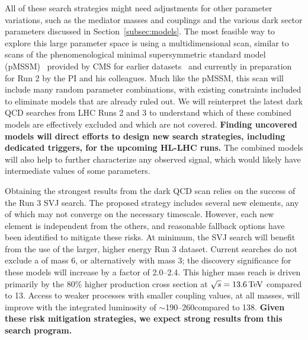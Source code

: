All of these search strategies might need adjustments for other parameter variations,
such as the mediator masses and couplings and the various dark sector parameters discussed in Section~\ref{subsec:models}.
The most feasible way to explore this large parameter space is using a multidimensional scan,
similar to scans of the phenomenological minimal supersymmetric standard model (pMSSM)~\cite{Djouadi:1998di}
provided by CMS for earlier datasets~\cite{Khachatryan:2016nvf,SUS-16-033-supp} and currently in preparation for Run 2 by the PI and his colleagues.
Much like the pMSSM, this scan will include many random parameter combinations, with existing constraints included to eliminate models that are already ruled out.
We will reinterpret the latest dark QCD searches from LHC Runs 2 and 3 to understand which of these combined models are effectively excluded and which are not covered.
\textbf{Finding uncovered models will direct efforts to design new search strategies, including dedicated triggers, for the upcoming HL-LHC runs.}
The combined models will also help to further characterize any observed signal, which would likely have intermediate values of some parameters.

Obtaining the strongest results from the dark QCD scan relies on the success of the Run 3 SVJ search.
The proposed strategy includes several new elements, any of which may not converge on the necessary timescale.
However, each new element is independent from the others, and reasonable fallback options have been identified to mitigate these risks.
At minimum, the SVJ search will benefit from the use of the larger, higher energy Run 3 dataset.
Current searches do not exclude a \PZprime of mass 6\TeV, or alternatively \Pbifun with mass 3\TeV;
the discovery significance for these models will increase by a factor of 2.0--2.4.
This higher mass reach is driven primarily by the 80\% higher production cross section at $\sqrt{s}=13.6\,\text{Te\hspace{-.08em}V}$ compared to 13\TeV.
Access to weaker processes with smaller coupling values, at all masses, will improve with the integrated luminosity of ${\sim}$190--260\fbinv compared to 138\fbinv.
\textbf{Given these risk mitigation strategies, we expect strong results from this search program.}
